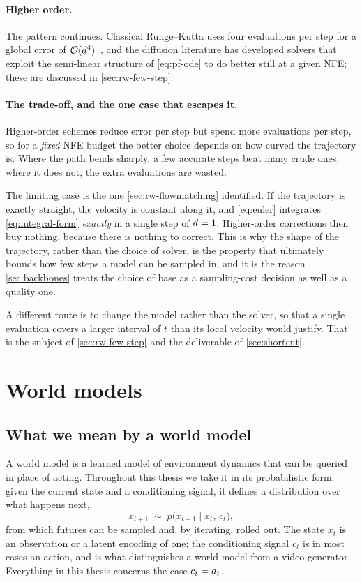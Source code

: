 \paragraph{Higher order.} The pattern continues. Classical
Runge--Kutta uses four evaluations per step for a global error of
$\mathcal{O}(d^4)$~\citep{hairer1993ode}, and the diffusion literature has developed solvers
that exploit the semi-linear structure of \cref{eq:pf-ode} to do better
still at a given NFE; these are discussed in \cref{sec:rw-few-step}.

\paragraph{The trade-off, and the one case that escapes it.} Higher-order
schemes reduce error per step but spend more evaluations per step, so for a
\emph{fixed} NFE budget the better choice depends on how curved the
trajectory is. Where the path bends sharply, a few accurate steps beat many
crude ones; where it does not, the extra evaluations are wasted.

The limiting case is the one \cref{sec:rw-flowmatching} identified. If the
trajectory is exactly straight, the velocity is constant along it, and
\cref{eq:euler} integrates \cref{eq:integral-form} \emph{exactly} in a
single step of $d = 1$. Higher-order corrections then buy nothing,
because there is nothing to correct. This is why the shape of the
trajectory, rather than the choice of solver, is the property that
ultimately bounds how few steps a model can be sampled in, and it is the
reason \cref{sec:backbones} treats the choice of base as a sampling-cost
decision as well as a quality one.

A different route is to change the model rather than the solver, so that a
single evaluation covers a larger interval of $t$ than its local velocity
would justify. That is the subject of \cref{sec:rw-few-step} and the
deliverable of \cref{sec:shortcut}.

\section{World models}
\label{sec:rw-world-models}

\subsection{What we mean by a world model}

A world model is a learned model of environment dynamics that can be
queried in place of acting. Throughout this thesis we take it in its
probabilistic form: given the current state and a conditioning signal, it
defines a distribution over what happens next,
\begin{equation}
  \label{eq:world-model}
  x_{t+1} \;\sim\; p\big(x_{t+1} \mid x_t,\, c_t\big),
\end{equation}
from which futures can be sampled and, by iterating, rolled out. The state
$x_t$ is an observation or a latent encoding of one; the conditioning signal
$c_t$ is in most cases an action, and is what distinguishes a world model
from a video generator. Everything in this thesis concerns the case
$c_t = a_t$.

